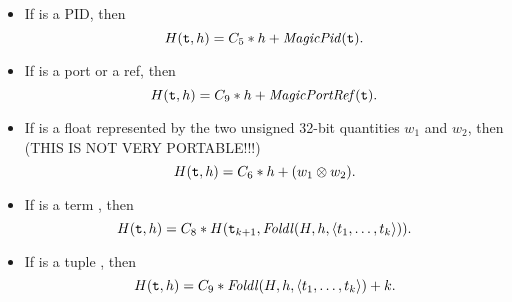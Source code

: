\begin{itemize}
\item If  is a PID, then
\[H({\tt{\sl t}},h) = C_5*h+{\it MagicPid}({\tt{\sl t}}).\]
\item If  is a port or a ref, then
\[H({\tt{\sl t}},h) = C_9*h+{\it MagicPortRef}({\tt{\sl t}}).\]
\item If  is a float represented by the two unsigned 32-bit quantities
$w_1$ and $w_2$, then (THIS IS NOT VERY PORTABLE!!!)
\[H({\tt{\sl t}},h) = C_6*h+(w_1 \otimes w_2).\]
\item If  is a term \T{[$\Z{t}_1$,\tdots,$\Z{t}_k$|$\Z{t}_{k+1}$]}, then
\[H({\tt{\sl t}},h) = C_8*H({\tt{\sl t}}_{k+1},{\it Foldl}(H,h,\langle t_1,\ldots,t_k\rangle)).\]
\item If  is a tuple , then
\[H({\tt{\sl t}},h) = C_9*{\it Foldl}(H,h,\langle t_1,\ldots,t_k\rangle)+k.\]
\end{itemize}
